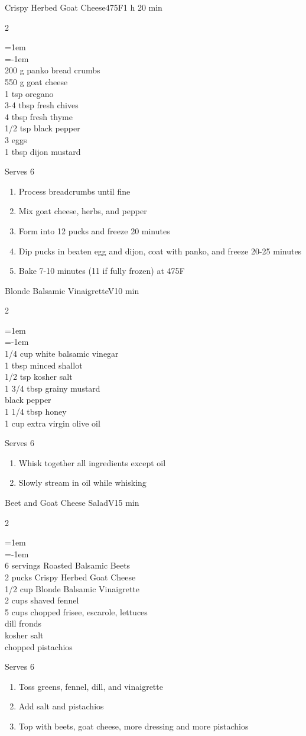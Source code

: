 \documentclass{article}
\newenvironment{recipe}[3][]
    {\begin{cardbase}[#1]{#2}{#3}
    \columnratio{0.333}
    \begin{paracol}{2}}
    {\end{paracol}\end{cardbase}}
\newenvironment{denserecipe}[3][]
    {\small
    \begin{recipe}[#1]{#2}{#3}}
    {\end{recipe}}
\newcommand{\nextcolumn}{\switchcolumn}
\newenvironment{ingredients}
    {
    \begin{obeylines}
    \vspace{\parskip}
    \setlength{\parskip}{0.25em}
    \vspace{-0.25em}
    \leftskip=1em
    \parindent=-1em}
    {\end{obeylines}}
\newenvironment{steps}
    {\begin{enumerate}[leftmargin=*,topsep=0pt]}
    {\end{enumerate}}
\newcommand{\fahrenheit}[1]{#1\textdegree{}F}
\newcommand{\tag}[1]{\hspace{1em}#1}
\newcommand{\symboltag}[2]{\tag{#1\hspace{0.4em}#2}}
\newcommand{\totaltime}[1]{\symboltag{\raisebox{-0.1em}{\small\StopWatchEnd}}{#1}}
\newcommand{\preheat}[1]{\symboltag{\Topbottomheat}{#1}}
\begin{document}
\begin{recipe}{Crispy Herbed Goat Cheese}{\preheat{\fahrenheit{475}}\totaltime{1 h 20 min}}
\begin{ingredients}
200 g panko bread crumbs
550 g goat cheese
1 tsp oregano
3-4 tbsp fresh chives
4 tbsp fresh thyme
1/2 tsp black pepper
3 eggs
1 tbsp dijon mustard
\end{ingredients}
\nextcolumn
Serves 6
\begin{steps}
\item Process breadcrumbs until fine
\item Mix goat cheese, herbs, and pepper
\item Form into 12 pucks and freeze 20 minutes
\item Dip pucks in beaten egg and dijon, coat with panko, and freeze 20-25 minutes
\item Bake 7-10 minutes (11 if fully frozen) at \fahrenheit{475}
\end{steps}
\end{recipe}

\begin{recipe}{Blonde Balsamic Vinaigrette}{\tag{V}\totaltime{10 min}}
\begin{ingredients}
1/4 cup white balsamic vinegar
1 tbsp minced shallot
1/2 tsp kosher salt
1 3/4 tbsp grainy mustard
black pepper
1 1/4 tbsp honey
1 cup extra virgin olive oil
\end{ingredients}
\nextcolumn
Serves 6
\begin{steps}
\item Whisk together all ingredients except oil
\item Slowly stream in oil while whisking
\end{steps}
\end{recipe}

\begin{denserecipe}{Beet and Goat Cheese Salad}{\tag{V}\totaltime{15 min}}
\begin{ingredients}
6 servings Roasted Balsamic Beets
2 pucks Crispy Herbed Goat Cheese
1/2 cup Blonde Balsamic Vinaigrette
2 cups shaved fennel
5 cups chopped frisee, escarole, lettuces
dill fronds
kosher salt
chopped pistachios
\end{ingredients}
\nextcolumn
Serves 6
\begin{steps}
\item Toss greens, fennel, dill, and vinaigrette
\item Add salt and pistachios
\item Top with beets, goat cheese, more dressing and more pistachios
\end{steps}
\end{denserecipe}
\end{document}
